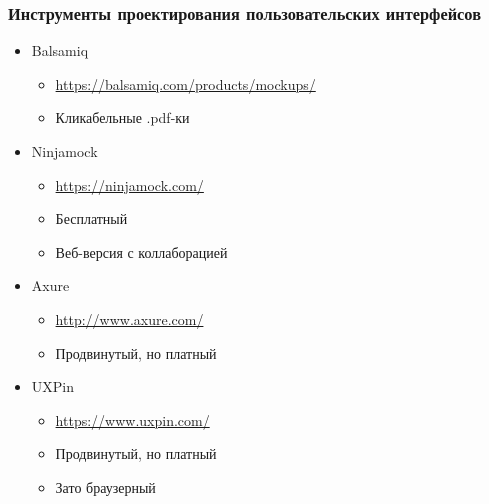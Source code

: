 \documentclass{../../slides-style}
\begin{document}
    \begin{frame}
        \frametitle{Инструменты проектирования пользовательских интерфейсов}
        \begin{itemize}
            \item Balsamiq
            \begin{itemize}
                \item \url{https://balsamiq.com/products/mockups/}
                \item Кликабельные .pdf-ки
            \end{itemize}
            \item Ninjamock
            \begin{itemize}
                \item \url{https://ninjamock.com/}
                \item Бесплатный
                \item Веб-версия с коллаборацией
            \end{itemize}
            \item Axure
            \begin{itemize}
                \item \url{http://www.axure.com/}
                \item Продвинутый, но платный
            \end{itemize}
            \item UXPin
            \begin{itemize}
                \item \url{https://www.uxpin.com/}
                \item Продвинутый, но платный
                \item Зато браузерный
            \end{itemize}
        \end{itemize}
    \end{frame}
\end{document}
